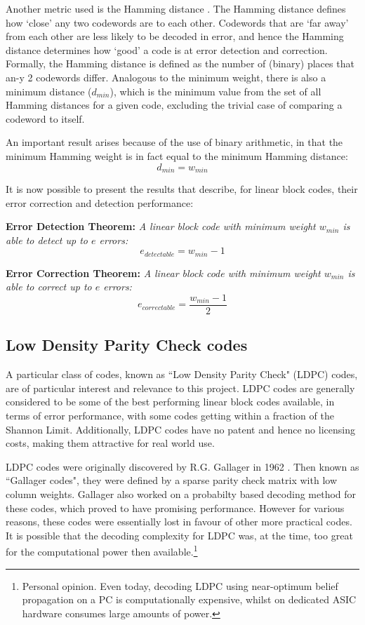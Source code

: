 \documentclass[11pt]{article}
\numberwithin{equation}{subsection}
\begin{document}
Another metric used is the Hamming distance \cite{coon15}. The Hamming distance defines how `close' any two codewords are to each other. Codewords that are `far away' from each other are less likely to be decoded in error, and hence the Hamming distance determines how `good' a code is at error detection and correction. Formally, the Hamming distance is defined as the number of (binary) places that an-y 2 codewords differ. Analogous to the minimum weight, there is also a minimum distance ($d_{min}$), which is the minimum value from the set of all Hamming distances for a given code, excluding the trivial case of comparing a codeword to itself.

An important result arises because of the use of binary arithmetic, in that the minimum Hamming weight is in fact equal to the minimum Hamming distance:
\begin{equation}
d_{min} = w_{min}
\end{equation}

It is now possible to present the results that describe, for linear block codes, their error correction and detection performance:

\medskip
\noindent
\textbf{Error Detection Theorem:}
\textit{A linear block code with minimum weight $w_{min}$ is able to detect up to $e$ errors:}
\begin{equation}
e_{detectable} = w_{min} - 1
\end{equation}

\noindent
\textbf{Error Correction Theorem:}
\textit{A linear block code with minimum weight $w_{min}$ is able to correct up to $e$ errors:}
\begin{equation}
e_{correctable} = \dfrac{w_{min} - 1}{2}
\end{equation}

\subsection{Low Density Parity Check codes}
A particular class of codes, known as ``Low Density Parity Check" (LDPC) codes, are of particular interest and relevance to this project. LDPC codes are generally considered to be some of the best performing linear block codes available, in terms of error performance, with some codes getting within a fraction of the Shannon Limit. Additionally, LDPC codes have no patent and hence no licensing costs, making them attractive for real world use.

LDPC codes were originally discovered by R.G. Gallager in 1962 \cite{gallager1962low}. Then known as ``Gallager codes", they were defined by a sparse parity check matrix with low column weights. Gallager also worked on a probabilty based decoding method for these codes, which proved to have promising performance. However for various reasons, these codes were essentially lost in favour of other more practical codes. It is possible that the decoding complexity for LDPC was, at the time, too great for the computational power then available.\footnote{Personal opinion. Even today, decoding LDPC using near-optimum belief propagation on a PC is computationally expensive, whilst on dedicated ASIC hardware consumes large amounts of power.}
\end{document}
